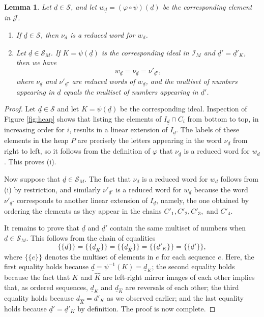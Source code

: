 \documentclass[10pt,a4paper]{amsart}
\newtheorem{lemma}[theorem]{Lemma}
\numberwithin{equation}{section}
\newcommand{\mset}[1]{\{\!\{#1\}\!\}}
\newcommand{\seqd}{\underline{d}}
\newcommand{\cali}{\mathcal{I}}
\newcommand{\calj}{\mathcal{J}}
\newcommand{\cals}{\mathcal{S}}
\newcommand{\inverse}{^{-1}}
\begin{document}
\begin{lemma}
\label{lem:d_d'}
Let $\seqd\in \cals$, and let $w_{\seqd}=(\varphi\circ\psi)(\seqd)$ be the corresponding element
in $\calj$.
\begin{enumerate}
  \item If $\seqd\in \cals$, then $\nu_{\seqd}$ is a reduced word for $w_{\seqd}$.
\item Let $\seqd\in \cals_M$. If $K=\psi(\seqd)$ is the corresponding ideal in
  $\cali_M$ and $\seqd'=\seqd'_K$, then we have   
\begin{equation}
\label{eq:lin_ext}
w_{\seqd}=\nu_{\seqd}=\nu'_{\seqd'},
\end{equation}
where $\nu_{\seqd}$ and $\nu'_{\seqd'}$ are reduced words of $w_{\seqd}$,  
  and the multiset of numbers appearing in $\seqd$ equals the
  multiset of numbers appearing in $\seqd'$.  
\end{enumerate}
\end{lemma}

\begin{proof}
Let $\seqd\in \cals$ and let $K=\psi(\seqd)$ be the corresponding ideal. Inspection of
Figure \ref{fig:heap} shows that listing the elements of $I_{\seqd}\cap C_i$ from
bottom to top, in increasing order for $i$, results in a linear extension of
$I_{\seqd}$. The labels of these elements in the heap $P$ are precisely the letters
appearing in the word $\nu_{\seqd}$ from right to left, so it follows from the
definition of $\varphi$ that $\nu_{\seqd}$ is a reduced word for $w_d$. This proves (i).

Now suppose that $\seqd\in \cals_M$. The fact that $\nu_{\seqd}$ is a reduced word for
$w_{\seqd}$ follows from (i) by restriction, and similarly $\nu'_{\seqd'}$ is a reduced word
for $w_{\seqd}$ because the word $\nu'_{\seqd'}$ corresponds to another linear extension
of $I_{\seqd}$, namely, the one obtained by ordering the elements as they appear in
the chains $C'_1, C'_2, C'_3,$ and $C'_4$. 


It remains to prove that $\seqd$ and $\seqd'$ contain the same multiset of numbers when
$\seqd\in \cals_M$. This follows from the chain of equalities
\[
  \mset{\seqd}=\mset{\seqd_K}=\mset{\seqd_{\hat K}}=\mset{\seqd'_{K}}=\mset{\seqd'}, 
\]
where $\mset{e}$ denotes the multiset of elements in $e$ for each sequence $e$.
Here, the first equality holds because $\seqd=\psi\inverse(K)=\seqd_K$; the
second equality holds because the fact that $K$ and $\hat K$ are left-right
mirror images of each other implies that, as ordered sequences, $\seqd_K$ and
$\seqd_{\hat K}$ are reversals of each other; the third equality holds because
$\seqd_{\hat K}=\seqd'_{K}$ as we observed earlier; and the last equality holds
because $\seqd'=\seqd'_K$ by definition. The proof is now complete. \end{proof}
\end{document}
